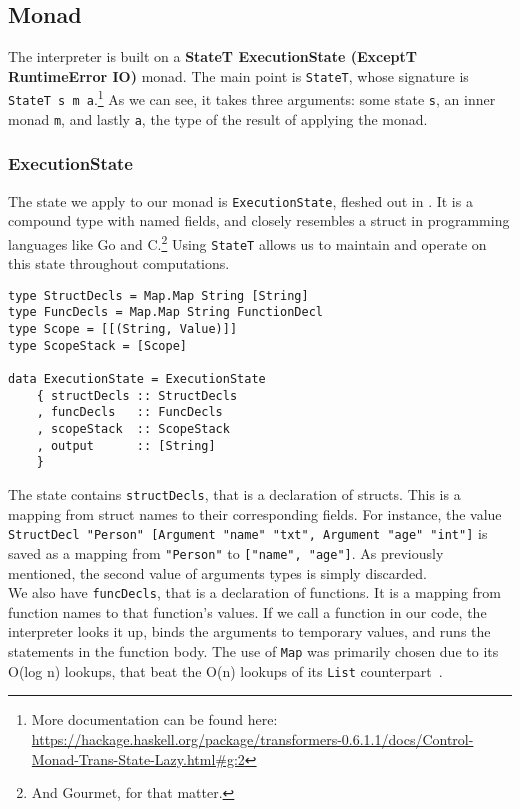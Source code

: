 \subsection{Monad}

The interpreter is built on a \textbf{StateT ExecutionState (ExceptT RuntimeError IO)} monad. The main point is \texttt{StateT}, whose signature is \texttt{StateT s m a}.\footnote{More documentation can be found here: \url{https://hackage.haskell.org/package/transformers-0.6.1.1/docs/Control-Monad-Trans-State-Lazy.html\#g:2}} As we can see, it takes three arguments: some state \texttt{s}, an inner monad \texttt{m}, and lastly \texttt{a}, the type of the result of applying the monad.

\subsubsection{ExecutionState}

The state we apply to our monad is \texttt{ExecutionState}, fleshed out in . It is a compound type with named fields, and closely resembles a struct in programming languages like Go and C.\footnote{And Gourmet, for that matter.} Using \texttt{StateT} allows us to maintain and operate on this state throughout computations. \\

\begin{lstlisting}[caption={The Psnodig interpreter's state.}, captionpos=b, label={psnodigInterpreterState}]
type StructDecls = Map.Map String [String]
type FuncDecls = Map.Map String FunctionDecl
type Scope = [[(String, Value)]]
type ScopeStack = [Scope]

data ExecutionState = ExecutionState
    { structDecls :: StructDecls
    , funcDecls   :: FuncDecls
    , scopeStack  :: ScopeStack
    , output      :: [String]
    }
\end{lstlisting}

The state contains \texttt{structDecls}, that is a declaration of structs. This is a mapping from struct names to their corresponding fields. For instance, the value \texttt{StructDecl "Person" [Argument "name" "txt", Argument "age" "int"]} is saved as a mapping from \texttt{"Person"} to \texttt{["name", "age"]}. As previously mentioned, the second value of arguments types is simply discarded. \\

We also have \texttt{funcDecls}, that is a declaration of functions. It is a mapping from function names to that function's values. If we call a function in our code, the interpreter looks it up, binds the arguments to temporary values, and runs the statements in the function body. The use of \texttt{Map} was primarily chosen due to its O(log n) lookups, that beat the O(n) lookups of its \texttt{List} counterpart~\cite{haskellMap, haskellList}. \\

